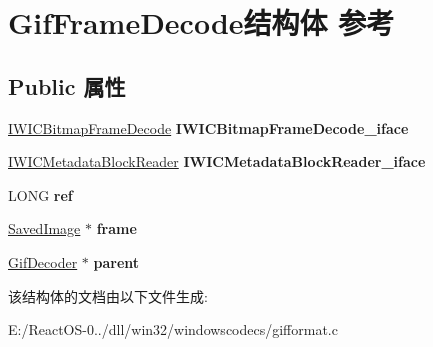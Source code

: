 \hypertarget{struct_gif_frame_decode}{}\section{Gif\+Frame\+Decode结构体 参考}
\label{struct_gif_frame_decode}
\subsection*{Public 属性}
\begin{DoxyCompactItemize}
\item 
\mbox{\label{struct_gif_frame_decode_a5829e729811dffe46da059037829d9ef}} 
\hyperlink{interface_i_w_i_c_bitmap_frame_decode}{I\+W\+I\+C\+Bitmap\+Frame\+Decode} {\bfseries I\+W\+I\+C\+Bitmap\+Frame\+Decode\+\_\+iface}
\item 
\mbox{\label{struct_gif_frame_decode_a0dccf997435866edc1ac95c783f1e15a}} 
\hyperlink{interface_i_w_i_c_metadata_block_reader}{I\+W\+I\+C\+Metadata\+Block\+Reader} {\bfseries I\+W\+I\+C\+Metadata\+Block\+Reader\+\_\+iface}
\item 
\mbox{\label{struct_gif_frame_decode_a20e68db0ad7ea77799042fffc35e0c82}} 
L\+O\+NG {\bfseries ref}
\item 
\mbox{\label{struct_gif_frame_decode_a07b52467730e0dc55974403c9e3f9658}} 
\hyperlink{struct_saved_image}{Saved\+Image} $\ast$ {\bfseries frame}
\item 
\mbox{\label{struct_gif_frame_decode_a23d1cb44fc14b0d5bc4f666cfd6227c0}} 
\hyperlink{struct_gif_decoder}{Gif\+Decoder} $\ast$ {\bfseries parent}
\end{DoxyCompactItemize}


该结构体的文档由以下文件生成\+:\begin{DoxyCompactItemize}
\item 
E\+:/\+React\+O\+S-\/0../dll/win32/windowscodecs/gifformat.\+c\end{DoxyCompactItemize}
